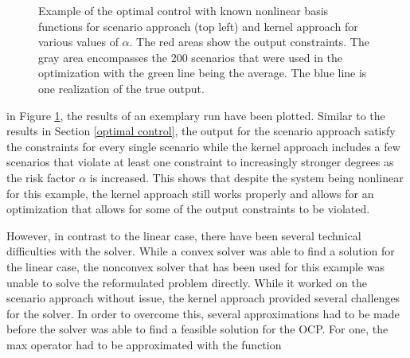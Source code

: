 \begin{figure}[htb]
{		\centering
 } 
\caption{Example of the optimal control with known nonlinear basis functions for scenario approach (top left) and kernel approach for various values of $\alpha$. The red areas show the output constraints. The gray area encompasses the 200 scenarios that were used in the optimization with the green line being the average. The blue line is one realization of the true output.}
\label{ScenarioKernelComparisonNonLinear}
\end{figure}

in Figure \ref{ScenarioKernelComparisonNonLinear}, the results of an exemplary run have been plotted. Similar to the results in Section \ref{optimal control}, the output for the scenario approach satisfy the constraints for every single scenario while the kernel approach includes a few scenarios that violate at least one constraint to increasingly stronger degrees as the risk factor $\alpha$ is increased. This shows that despite the system being nonlinear for this example, the kernel approach still works properly and allows for an optimization that allows for some of the output constraints to be violated.

However, in contrast to the linear case, there have been several technical difficulties with the solver. While a convex solver was able to find a solution for the linear case, the nonconvex solver that has been used for this example was unable to solve the reformulated problem directly. While it worked on the scenario approach without issue, the kernel approach provided several challenges for the solver. In order to overcome this, several approximations had to be made before the solver was able to find a feasible solution for the OCP. For one, the max operator had to be approximated with the function

